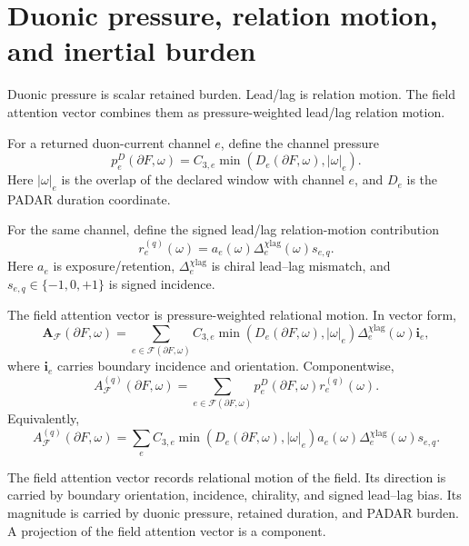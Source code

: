 \section{Duonic pressure, relation motion, and inertial burden}\label{sec:duonic-pressure-inertia}

Duonic pressure is scalar retained burden. Lead/lag is relation motion. The field attention vector combines them as pressure-weighted lead/lag relation motion.

\begin{definition}
For a returned duon-current channel \(e\), define the channel pressure
\[
p^D_e(\partial F,\omega)
=
C_{3,e}
\min\!\left(D_e(\partial F,\omega),|\omega|_e\right).
\]
Here \(|\omega|_e\) is the overlap of the declared window with channel \(e\), and \(D_e\) is the PADAR duration coordinate.
\end{definition}

\begin{definition}
For the same channel, define the signed lead/lag relation-motion contribution
\[
r^{(q)}_e(\omega)=a_e(\omega)\Delta^{\chi\mathrm{lag}}_e(\omega)s_{e,q}.
\]
Here \(a_e\) is exposure/retention, \(\Delta^{\chi\mathrm{lag}}_e\) is chiral lead--lag mismatch, and \(s_{e,q}\in\{-1,0,+1\}\) is signed incidence.
\end{definition}

\begin{definition}
The field attention vector is pressure-weighted relational motion. In vector form,
\[
\mathbf A_{\mathcal F}(\partial F,\omega)=
\sum_{e\in\mathcal F(\partial F,\omega)}
C_{3,e}\min\!\left(D_e(\partial F,\omega),|\omega|_e\right)
\Delta^{\chi\mathrm{lag}}_e(\omega)\mathbf i_e,
\]
where \(\mathbf i_e\) carries boundary incidence and orientation. Componentwise,
\[
A_{\mathcal F}^{(q)}(\partial F,\omega)=
\sum_{e\in\mathcal F(\partial F,\omega)}
p^D_e(\partial F,\omega)r^{(q)}_e(\omega).
\]
Equivalently,
\[
A_{\mathcal F}^{(q)}(\partial F,\omega)=
\sum_e
C_{3,e}
\min\!\left(D_e(\partial F,\omega),|\omega|_e\right)
 a_e(\omega)\Delta^{\chi\mathrm{lag}}_e(\omega)s_{e,q}.
\]
\end{definition}

The field attention vector records relational motion of the field. Its direction is carried by boundary orientation, incidence, chirality, and signed lead--lag bias. Its magnitude is carried by duonic pressure, retained duration, and PADAR burden. A projection of the field attention vector is a component.

